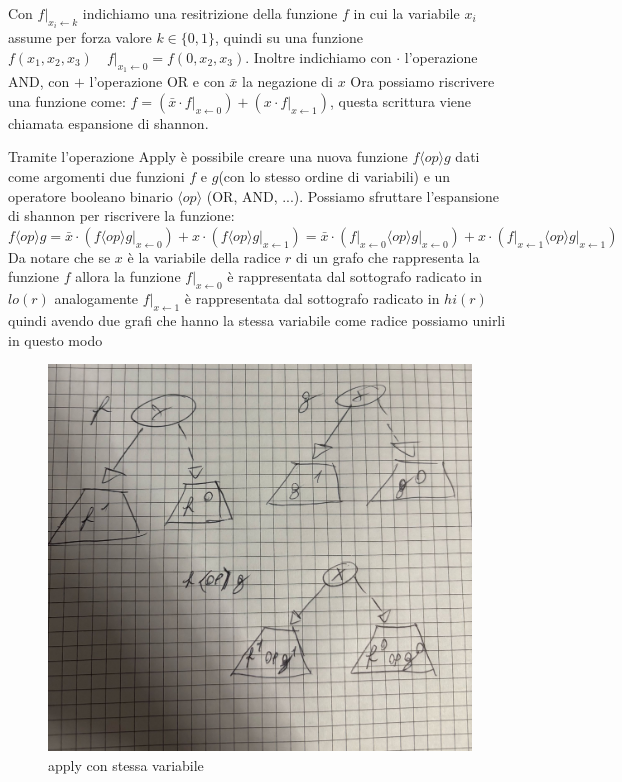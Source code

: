 \documentclass{article}
\begin{document}
Con $f\rvert_{x_i\leftarrow k}$ indichiamo una resitrizione della funzione $f$ in cui la variabile $x_i$ assume per forza valore $k \in \{0,1\}$, quindi su una funzione $f(x_1,x_2,x_3) \quad
f\rvert_{x_1\leftarrow 0} = f(0, x_2, x_3)$.
Inoltre indichiamo con $\cdot$ l'operazione AND, con $+$ l'operazione OR e con $\bar{x}$ la negazione di $x$
Ora possiamo riscrivere una funzione come: $f = (\bar{x} \cdot f\rvert_{x \leftarrow 0}) + (x \cdot f\rvert_{x \leftarrow 1})$, questa scrittura viene chiamata espansione di shannon.

Tramite l'operazione Apply è possibile creare una nuova funzione $f \langle op \rangle g$  dati come argomenti due funzioni $f$ e $g$(con lo stesso ordine di variabili) e un operatore booleano binario $\langle op \rangle$ (OR, AND, ...).
Possiamo sfruttare l'espansione di shannon per riscrivere la funzione: $f \langle op \rangle g = \bar{x} \cdot (f \langle op \rangle g \rvert_{x \leftarrow 0}) + x \cdot (f \langle op \rangle g \rvert_{x \leftarrow 1}) =  \bar{x} \cdot (f\rvert_{x \leftarrow 0} \langle op \rangle g\rvert_{x \leftarrow 0}) + x \cdot (f\rvert_{x \leftarrow 1} \langle op \rangle g \rvert_{x \leftarrow 1})$ 
Da notare che se $x$ è la variabile della radice $r$ di un grafo che rappresenta la funzione $f$ allora la funzione $f \rvert _{x \leftarrow 0 }$ è rappresentata dal sottografo radicato in $lo(r)$ analogamente $f \rvert _{x \leftarrow 1}$ è rappresentata dal sottografo radicato in $hi(r)$ quindi avendo due grafi che hanno la stessa variabile come radice possiamo unirli in questo modo

\begin{figure}[H]
    \centering
    \includegraphics[max width=\linewidth, max height=0.38\textheight, keepaspectratio]{Resources/applySameLabel.jpg}
    \caption{apply con stessa variabile}
    \label{fig:apply1}
\end{figure}
\end{document}

